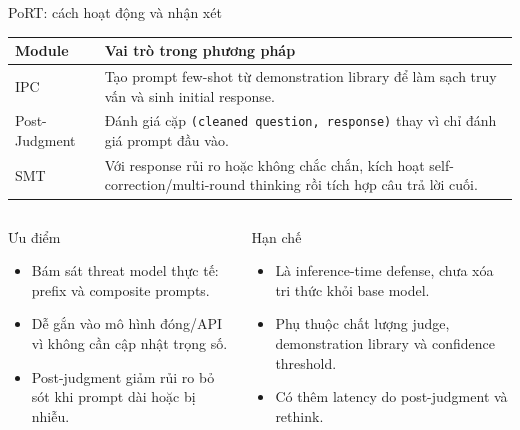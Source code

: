 \documentclass[t, aspectratio=169]{beamer}
\newcommand{\code}[1]{\texttt{#1}}
\newcommand{\rowrule}{\midrule[0.25pt]}
\begin{document}
\begin{frame}{PoRT: cách hoạt động và nhận xét}
  \scriptsize
  \begin{tabularx}{\textwidth}{l Y}
    \toprule
    \textbf{Module} & \textbf{Vai trò trong phương pháp} \\
    \midrule
    IPC & Tạo prompt few-shot từ demonstration library để làm sạch truy vấn và sinh initial response. \\
    \rowrule
    Post-Judgment & Đánh giá cặp \code{(cleaned question, response)} thay vì chỉ đánh giá prompt đầu vào. \\
    \rowrule
    SMT & Với response rủi ro hoặc không chắc chắn, kích hoạt self-correction/multi-round thinking rồi tích hợp câu trả lời cuối. \\
    \bottomrule
  \end{tabularx}

  \vspace{0.45em}
  \begin{columns}[T]
    \begin{column}{0.48\textwidth}
      \begin{block}{Ưu điểm}
        \begin{itemize}
          \item Bám sát threat model thực tế: prefix và composite prompts.
          \item Dễ gắn vào mô hình đóng/API vì không cần cập nhật trọng số.
          \item Post-judgment giảm rủi ro bỏ sót khi prompt dài hoặc bị nhiễu.
        \end{itemize}
      \end{block}
    \end{column}
    \begin{column}{0.48\textwidth}
      \begin{alertblock}{Hạn chế}
        \begin{itemize}
          \item Là inference-time defense, chưa xóa tri thức khỏi base model.
          \item Phụ thuộc chất lượng judge, demonstration library và confidence threshold.
          \item Có thêm latency do post-judgment và rethink.
        \end{itemize}
      \end{alertblock}
    \end{column}
  \end{columns}
\end{frame}
\end{document}
